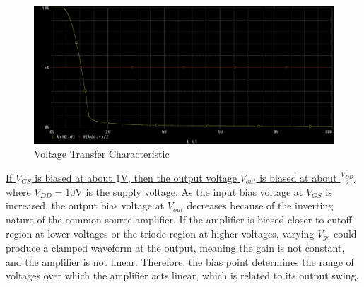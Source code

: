 \FloatBarrier

\begin{figure}[h!]
	\centering
	\includegraphics[scale=0.50]{./images/vout_vs_v3.PNG}
	\caption{Voltage Transfer Characteristic}
	\label{fig:vout_vs_v3}
\end{figure}

\FloatBarrier

\uline{If $V_{GS}$ is biased at about $1$\si{\volt}, then the output voltage $V_{out}$ is biased at about $\frac{V_{DD}}{2}$, where $V_{DD} = 10$\si{\volt} is the supply voltage.} As the input bias voltage at $V_{GS}$ is increased, the output bias voltage at $V_{out}$ decreases because of the inverting nature of the common source amplifier. If the amplifier is biased closer to cutoff region at lower voltages or the triode region at higher voltages, varying $V_{gs}$ could produce a clamped waveform at the output, meaning the gain is not constant, and the amplifier is not linear. Therefore, the bias point determines the range of voltages over which the amplifier acts linear, which is related to its output swing. \\
